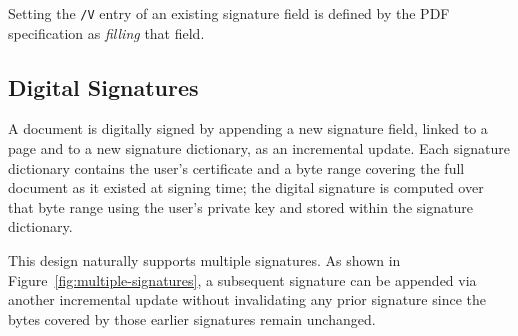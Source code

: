 \documentclass[12pt]{article}
\begin{document}
Setting the \texttt{/V} entry of an existing signature field is defined by the PDF specification as \emph{filling} that field.

\subsection{Digital Signatures}

A document is digitally signed by appending a new signature field, linked to a page and to a new
signature dictionary, as an incremental update. Each signature dictionary contains the user's
certificate and a byte range covering the full document as it existed at signing time; the digital signature is computed over that byte range using the user's private key and stored within the signature dictionary.

This design naturally supports multiple signatures. As shown in Figure~\ref{fig:multiple-signatures}, a subsequent signature can be appended via another incremental update without invalidating any prior signature since the bytes covered by those earlier signatures remain unchanged.
\end{document}

